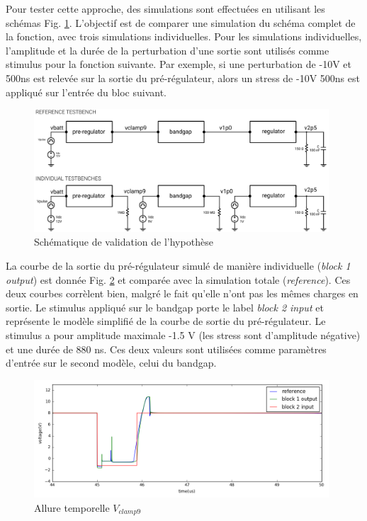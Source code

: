 Pour tester cette approche, des simulations sont effectuées en utilisant les schémas Fig. \ref{fig:hypothesis-setup}.
L'objectif est de comparer une simulation du schéma complet de la fonction, avec trois simulations individuelles.
Pour les simulations individuelles, l'amplitude et la durée de la perturbation d'une sortie sont utilisés comme stimulus pour la fonction suivante.
Par exemple, si une perturbation de -10V et 500ns est relevée sur la sortie du pré-régulateur, alors un stress de -10V 500ns est appliqué sur l'entrée du bloc suivant.

\begin{figure}[!h]
  \centering
  \includegraphics[width=0.98\textwidth]{src/1/figures/hypothesis_testing_setup.pdf}
  \caption{Schématique de validation de l'hypothèse}
  \label{fig:hypothesis-setup}
\end{figure}

La courbe de la sortie du pré-régulateur simulé de manière individuelle (\textit{block 1 output}) est donnée Fig. \ref{fig:sim-compare-block1} et comparée avec la simulation totale (\textit{reference}).
Ces deux courbes corrèlent bien, malgré le fait qu'elle n'ont pas les mêmes charges en sortie.
Le stimulus appliqué sur le bandgap porte le label \textit{block 2 input} et représente le modèle simplifié de la courbe de sortie du pré-régulateur.
Le stimulus a pour amplitude maximale -1.5 V (les stress sont d'amplitude négative) et une durée de 880 ns.
Ces deux valeurs sont utilisées comme paramètres d'entrée sur le second modèle, celui du bandgap.

\begin{figure}[!h]
  \centering
  \includegraphics[width=0.98\textwidth]{src/1/figures/simulation_comparison_block1.png}
  \caption{Allure temporelle $V_{clamp9}$}
  \label{fig:sim-compare-block1}
\end{figure}

